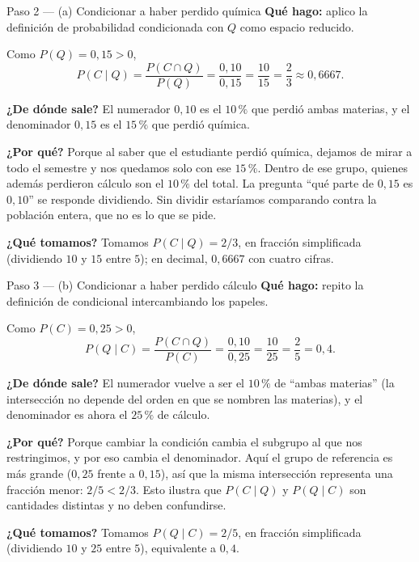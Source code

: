 \documentclass[11pt]{article}
\begin{document}
\begin{paso}{Paso 2 --- (a) Condicionar a haber perdido química}
\textbf{Qué hago:} aplico la definición de probabilidad condicionada con $Q$ como espacio reducido.

Como $P(Q)=0{,}15>0$,
\[
P(C\mid Q)=\frac{P(C\cap Q)}{P(Q)}=\frac{0{,}10}{0{,}15}=\frac{10}{15}=\frac{2}{3}\approx 0{,}6667.
\]

\textbf{¿De dónde sale?} El numerador $0{,}10$ es el $10\,\%$ que perdió ambas materias, y el denominador $0{,}15$ es el $15\,\%$ que perdió química.

\textbf{¿Por qué?} Porque al saber que el estudiante perdió química, dejamos de mirar a todo el semestre y nos quedamos solo con ese $15\,\%$. Dentro de ese grupo, quienes además perdieron cálculo son el $10\,\%$ del total. La pregunta ``qué parte de $0{,}15$ es $0{,}10$'' se responde dividiendo. Sin dividir estaríamos comparando contra la población entera, que no es lo que se pide.

\textbf{¿Qué tomamos?} Tomamos $P(C\mid Q)=2/3$, en fracción simplificada (dividiendo $10$ y $15$ entre $5$); en decimal, $0{,}6667$ con cuatro cifras.
\end{paso}

\begin{paso}{Paso 3 --- (b) Condicionar a haber perdido cálculo}
\textbf{Qué hago:} repito la definición de condicional intercambiando los papeles.

Como $P(C)=0{,}25>0$,
\[
P(Q\mid C)=\frac{P(C\cap Q)}{P(C)}=\frac{0{,}10}{0{,}25}=\frac{10}{25}=\frac{2}{5}=0{,}4.
\]

\textbf{¿De dónde sale?} El numerador vuelve a ser el $10\,\%$ de ``ambas materias'' (la intersección no depende del orden en que se nombren las materias), y el denominador es ahora el $25\,\%$ de cálculo.

\textbf{¿Por qué?} Porque cambiar la condición cambia el subgrupo al que nos restringimos, y por eso cambia el denominador. Aquí el grupo de referencia es más grande ($0{,}25$ frente a $0{,}15$), así que la misma intersección representa una fracción menor: $2/5<2/3$. Esto ilustra que $P(C\mid Q)$ y $P(Q\mid C)$ son cantidades distintas y no deben confundirse.

\textbf{¿Qué tomamos?} Tomamos $P(Q\mid C)=2/5$, en fracción simplificada (dividiendo $10$ y $25$ entre $5$), equivalente a $0{,}4$.
\end{paso}
\end{document}
